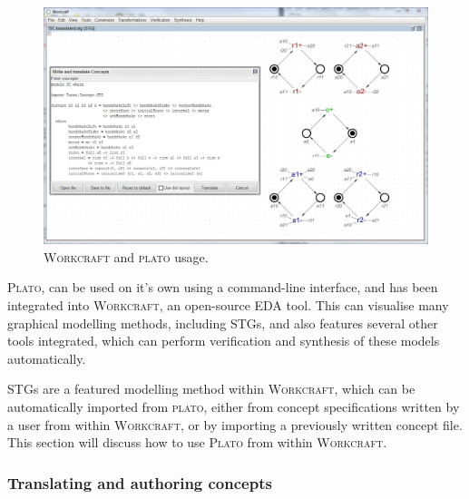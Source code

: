 \documentclass[british,conference,compsoc]{IEEEtran}
\newcommand{\noun}[1]{\textsc{#1}}
\begin{document}
\begin{figure}[t]
\begin{centering}
\vspace{-3mm}
\includegraphics[scale=0.45]{Images/workcraft_design_flow.JPG}
\par\end{centering}
\begin{centering}
\protect\caption{\label{fig:design_flow_screenshot}\noun{Workcraft} and 
			\noun{plato} usage.}
\par\end{centering}
\vspace{-3mm}
\end{figure}

\noun{Plato}, can be used on it's own using a command-line interface, and has been
integrated into \noun{Workcraft}, an open-source EDA tool. This can visualise many graphical modelling
methods, including STGs, and also features several other tools integrated, which can perform verification
and synthesis of these models automatically.

STGs are a featured modelling method within \noun{Workcraft},
which can be automatically imported from \noun{plato}, either from concept specifications written by a user from within 
\noun{Workcraft}, or by importing a previously written concept file. 
This section will discuss how to use \noun{Plato} from within
\noun{Workcraft}.

\vspace{-2mm}
 
\subsubsection{Translating and authoring concepts}
\end{document}
